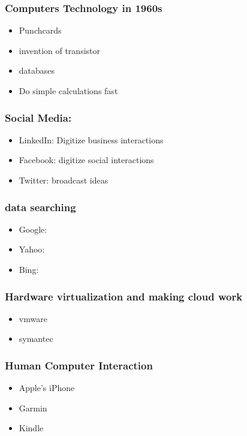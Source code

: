 


\begin{frame}
\frametitle{Computers Technology in 1960s}
\begin{itemize}
\item Punchcards
\item invention of transistor
\item databases
\item Do simple calculations fast
\end{itemize}
\end{frame}

\begin{frame}
\frametitle{Social Media:}
\begin{itemize}
\item LinkedIn: Digitize business interactions
\item Facebook: digitize social interactions
\item Twitter: broadcast ideas
\end{itemize}
\end{frame}

\begin{frame}
\frametitle{data searching}
\begin{itemize}
\item Google:
\item Yahoo:
\item Bing:
\end{itemize}
\end{frame}



\begin{frame}
\frametitle{Hardware virtualization and making cloud work}
\begin{itemize}
\item vmware
\item symantec
\end{itemize}
\end{frame}


\begin{frame}
\frametitle{Human Computer Interaction}
\begin{itemize}
\item Apple's iPhone
\item Garmin
\item Kindle
\end{itemize}


\end{frame}


